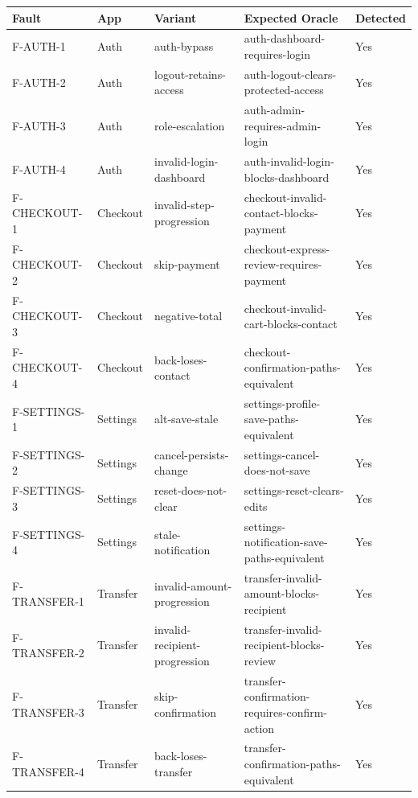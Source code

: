 \begin{tabular}{lllll}
\toprule
Fault & App & Variant & Expected Oracle & Detected \\
\midrule
F-AUTH-1 & Auth & auth-bypass & auth-dashboard-requires-login & Yes \\
F-AUTH-2 & Auth & logout-retains-access & auth-logout-clears-protected-access & Yes \\
F-AUTH-3 & Auth & role-escalation & auth-admin-requires-admin-login & Yes \\
F-AUTH-4 & Auth & invalid-login-dashboard & auth-invalid-login-blocks-dashboard & Yes \\
F-CHECKOUT-1 & Checkout & invalid-step-progression & checkout-invalid-contact-blocks-payment & Yes \\
F-CHECKOUT-2 & Checkout & skip-payment & checkout-express-review-requires-payment & Yes \\
F-CHECKOUT-3 & Checkout & negative-total & checkout-invalid-cart-blocks-contact & Yes \\
F-CHECKOUT-4 & Checkout & back-loses-contact & checkout-confirmation-paths-equivalent & Yes \\
F-SETTINGS-1 & Settings & alt-save-stale & settings-profile-save-paths-equivalent & Yes \\
F-SETTINGS-2 & Settings & cancel-persists-change & settings-cancel-does-not-save & Yes \\
F-SETTINGS-3 & Settings & reset-does-not-clear & settings-reset-clears-edits & Yes \\
F-SETTINGS-4 & Settings & stale-notification & settings-notification-save-paths-equivalent & Yes \\
F-TRANSFER-1 & Transfer & invalid-amount-progression & transfer-invalid-amount-blocks-recipient & Yes \\
F-TRANSFER-2 & Transfer & invalid-recipient-progression & transfer-invalid-recipient-blocks-review & Yes \\
F-TRANSFER-3 & Transfer & skip-confirmation & transfer-confirmation-requires-confirm-action & Yes \\
F-TRANSFER-4 & Transfer & back-loses-transfer & transfer-confirmation-paths-equivalent & Yes \\
\bottomrule
\end{tabular}
